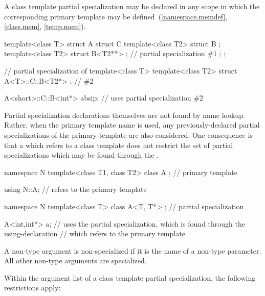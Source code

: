 \pnum
A class template partial specialization may be declared in any
scope in which the corresponding primary template
may be defined~(\ref{namespace.memdef}, \ref{class.mem}, \ref{temp.mem}).
\begin{example}
\begin{codeblock}
template<class T> struct A {
  struct C {
    template<class T2> struct B { };
    template<class T2> struct B<T2**> { };      // partial specialization \#1
  };
};

// partial specialization of 
template<class T> template<class T2>
  struct A<T>::C::B<T2*> { };                   // \#2

A<short>::C::B<int*> absip;                     // uses partial specialization \#2
\end{codeblock}
\end{example}

\pnum
Partial specialization declarations themselves are not found by name lookup.
Rather, when the primary template name is used, any previously-declared partial
specializations of the primary template are also considered.
One consequence is
that a
which refers to a class template does not restrict the set of partial specializations
which may be found through the
.
\begin{example}
\begin{codeblock}
namespace N {
  template<class T1, class T2> class A { };     // primary template
}

using N::A;                                     // refers to the primary template

namespace N {
  template<class T> class A<T, T*> { };         // partial specialization
}

A<int,int*> a;      // uses the partial specialization, which is found through the using-declaration
                    // which refers to the primary template
\end{codeblock}
\end{example}

\pnum
A non-type argument is non-specialized if it is the name of a non-type
parameter.
All other non-type arguments are specialized.

\pnum
Within the argument list of a class template partial specialization,
the following restrictions apply:

